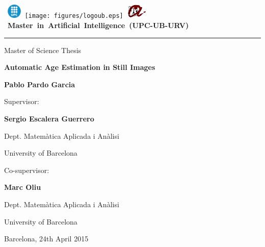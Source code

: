\thispagestyle{empty}
\vspace*{-2cm}

\hbox{
\includegraphics[width=0.7cm]{figures/logoupc.eps}
\texttt{[image: figures/logoub.eps]}
\includegraphics[width=1cm]{figures/logourv.eps}
\Large \bf Master in Artificial Intelligence (UPC-UB-URV)}
\hrule

\bigskip\bigskip\bigskip

\begin{center}

{\LARGE Master of Science Thesis}

\bigskip\bigskip\bigskip\bigskip\bigskip

\textbf{\huge \bf Automatic Age Estimation in Still Images}

\bigskip\bigskip\bigskip\bigskip\bigskip

{\LARGE \bf Pablo Pardo Garcia}

\vspace*{5cm}

\begin{multicols}{2}
{\large Supervisor:}

\medskip\medskip\smallskip

{\Large\bf Sergio Escalera Guerrero}

\medskip\medskip

{\Large Dept. Matemàtica Aplicada i Anàlisi}

\medskip

{\Large University of Barcelona}


\bigskip\bigskip\bigskip

{\large Co-supervisor:}

\medskip\medskip\smallskip

{\Large\bf Marc Oliu}

\medskip\medskip

{\Large Dept. Matemàtica Aplicada i Anàlisi}

\medskip

{\Large University of Barcelona}
\end{multicols}

\medskip\medskip\medskip\medskip\medskip

{\Large Barcelona, 24th April 2015}

\end{center}


